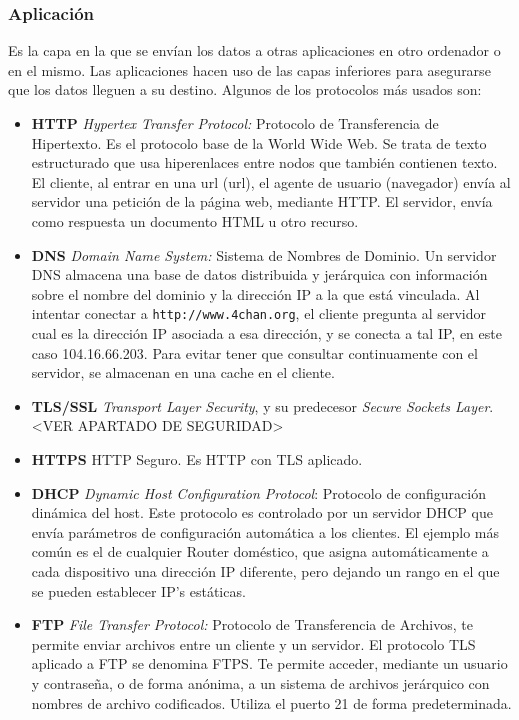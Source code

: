 \documentclass[a4paper, 11pt]{report} %
\newcommand{\acr}[1]{\acrshort{#1} (\acrlong{#1})}
\begin{document}
\subsubsection{Aplicación}
Es la capa en la que se envían los datos a otras aplicaciones en otro ordenador o en el mismo. Las aplicaciones hacen uso de las capas inferiores para asegurarse que los datos lleguen a su destino. Algunos de los protocolos más usados son:
\begin{itemize}
\item \textbf{HTTP} \textit{Hypertex Transfer Protocol:} Protocolo de Transferencia de Hipertexto. Es el protocolo base de la World Wide Web. Se trata de texto estructurado que usa hiperenlaces entre nodos que también contienen texto. El cliente, al entrar en una \acr{url}, el agente de usuario (navegador) envía al servidor una petición de la página web, mediante HTTP. El servidor, envía como respuesta un documento HTML u otro recurso.
\item \textbf{DNS} \textit{Domain Name System:} Sistema de Nombres de Dominio. Un servidor DNS almacena una base de datos distribuida y jerárquica con información sobre el nombre del dominio y la dirección IP a la que está vinculada. Al intentar conectar a  \texttt{http://www.4chan.org}, el cliente pregunta al servidor cual es la dirección IP asociada a esa dirección, y se conecta a tal IP, en este caso 104.16.66.203. Para evitar tener que consultar continuamente con el servidor, se almacenan en una \gls{cache} en el cliente.
\item \textbf{TLS/SSL} \textit{Transport Layer Security}, y su predecesor \textit{Secure Sockets Layer}. <VER APARTADO DE SEGURIDAD>
\item \textbf{HTTPS} HTTP Seguro. Es HTTP con TLS aplicado.
\item \textbf{DHCP} \textit{Dynamic Host Configuration Protocol}: Protocolo de configuración dinámica del host. Este protocolo es controlado por un servidor DHCP que envía parámetros de configuración automática a los clientes. El ejemplo más común es el de cualquier Router doméstico, que asigna automáticamente a cada dispositivo una dirección IP diferente, pero dejando un rango en el que se pueden establecer IP's estáticas.
\item \textbf{FTP} \textit{File Transfer Protocol:} Protocolo de Transferencia de Archivos, te permite enviar archivos entre un cliente y un servidor. El protocolo TLS aplicado a FTP se denomina FTPS. Te permite acceder, mediante un usuario y contraseña, o de forma anónima, a un sistema de archivos jerárquico con nombres de archivo codificados. Utiliza el puerto 21 de forma predeterminada.

\end{itemize}
\end{document}
